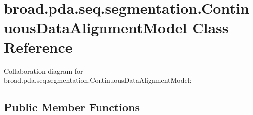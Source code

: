 \hypertarget{classbroad_1_1pda_1_1seq_1_1segmentation_1_1_continuous_data_alignment_model}{\section{broad.\+pda.\+seq.\+segmentation.\+Continuous\+Data\+Alignment\+Model Class Reference}
\label{classbroad_1_1pda_1_1seq_1_1segmentation_1_1_continuous_data_alignment_model}
}


Collaboration diagram for broad.\+pda.\+seq.\+segmentation.\+Continuous\+Data\+Alignment\+Model\+:
\subsection*{Public Member Functions}
